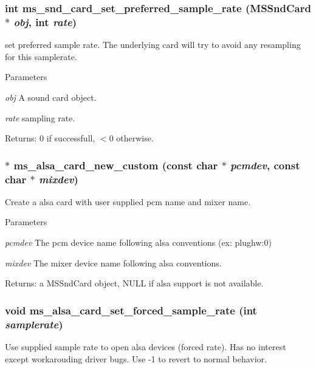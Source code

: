 \subsubsection[{ms\_\-snd\_\-card\_\-set\_\-preferred\_\-sample\_\-rate}]{\setlength{\rightskip}{0pt plus 5cm}int ms\_\-snd\_\-card\_\-set\_\-preferred\_\-sample\_\-rate ({\bf MSSndCard} $\ast$ {\em obj}, \/  int {\em rate})}\label{group__mediastreamer2__soundcardfilter_ga76830e16cf70fe664e1a34e379acc177}
set preferred sample rate. The underlying card will try to avoid any resampling for this samplerate.


\begin{DoxyParams}{Parameters}
\item[{\em obj}]A sound card object. \item[{\em rate}]sampling rate.\end{DoxyParams}
Returns: 0 if successfull, $<$0 otherwise. 
\subsubsection[{ms\_\-alsa\_\-card\_\-new\_\-custom}]{$\ast$ ms\_\-alsa\_\-card\_\-new\_\-custom (const char $\ast$ {\em pcmdev}, \/  const char $\ast$ {\em mixdev})}\label{group__mediastreamer2__soundcardfilter_gac467a6da38344bd6ea5aa54ff7f0ddbd}
Create a alsa card with user supplied pcm name and mixer name. 
\begin{DoxyParams}{Parameters}
\item[{\em pcmdev}]The pcm device name following alsa conventions (ex: plughw:0) \item[{\em mixdev}]The mixer device name following alsa conventions.\end{DoxyParams}
Returns: a MSSndCard object, NULL if alsa support is not available. 
\subsubsection[{ms\_\-alsa\_\-card\_\-set\_\-forced\_\-sample\_\-rate}]{\setlength{\rightskip}{0pt plus 5cm}void ms\_\-alsa\_\-card\_\-set\_\-forced\_\-sample\_\-rate (int {\em samplerate})}\label{group__mediastreamer2__soundcardfilter_ga59b3c314af71e8246a46d4eae133aeab}
Use supplied sample rate to open alsa devices (forced rate). Has no interest except workarouding driver bugs. Use -\/1 to revert to normal behavior. 